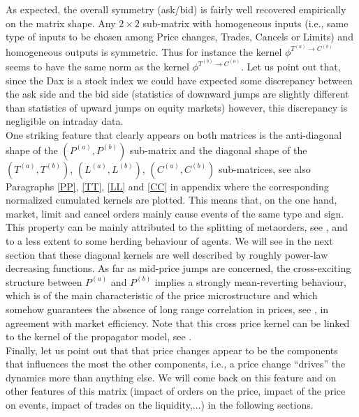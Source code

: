 \documentclass[a4paper,11pt]{article}
\newcommand{\PA}{P^{(a)}}
\newcommand{\PB}{P^{(b)}}
\newcommand{\TA}{T^{(a)}}
\newcommand{\TB}{T^{(b)}}
\newcommand{\CA}{C^{(a)}}
\newcommand{\CB}{C^{(b)}}
\newcommand{\LA}{L^{(a)}}
\newcommand{\LB}{L^{(b)}}
\begin{document}
\noindent As expected, the overall symmetry (ask/bid) is fairly well recovered empirically on the matrix shape.
Any $2\times 2$ sub-matrix with homogeneous inputs (i.e., same type of inputs to be chosen among Price changes, Trades, Cancels or Limits) and homogeneous outputs is symmetric.
Thus for instance the kernel $\phi^{\TA \rightarrow \CB}$ seems to have the same norm as the kernel
$\phi^{\TB \rightarrow \CA}$. Let us point out that, since the Dax is a stock index we could have expected some discrepancy between the ask side and the bid side (statistics of downward jumps are slightly different than statistics of upward jumps on equity markets) however, this discrepancy is negligible on intraday data.\\

\noindent One striking feature that clearly appears on both matrices is the anti-diagonal shape of the $(\PA,\PB)$ sub-matrix and the diagonal shape of the $(\TA,\TB)$, $(\LA,\LB)$, $(\CA,\CB)$ sub-matrices, see also Paragraphs \ref{PP}, \ref{TT}, \ref{LL} and \ref{CC} in appendix where the corresponding normalized cumulated kernels are plotted. This means that, on the one hand, market, limit and cancel orders mainly cause events of the same type and sign. This property can be mainly attributed to the splitting of metaorders, see \cite{lillo2005theory}, and to a less extent to some herding behaviour of agents. We will see in the next section that these diagonal kernels are well described by roughly power-law decreasing functions. As far as mid-price jumps are concerned, the cross-exciting structure between $\PA$ and $\PB$ implies a strongly mean-reverting behaviour, which is of the main characteristic of the price microstructure and  which somehow guarantees the absence of long range correlation in prices, see \cite{bacry2014hawkes}, in agreement with market efficiency. Note that this cross price kernel can be linked to the kernel of the propagator model, see \cite{bouchaud2004fluctuations,jaisson2014market}. \\

\noindent Finally, let us point out that that price changes appear to be the components that influences the most the other components, i.e., a price change ``drives'' the dynamics more than anything else.
We will come back on this feature and on other features of this matrix (impact of orders on the price, impact of the price on events, impact of trades on the liquidity,...) in the following sections.
\end{document}
